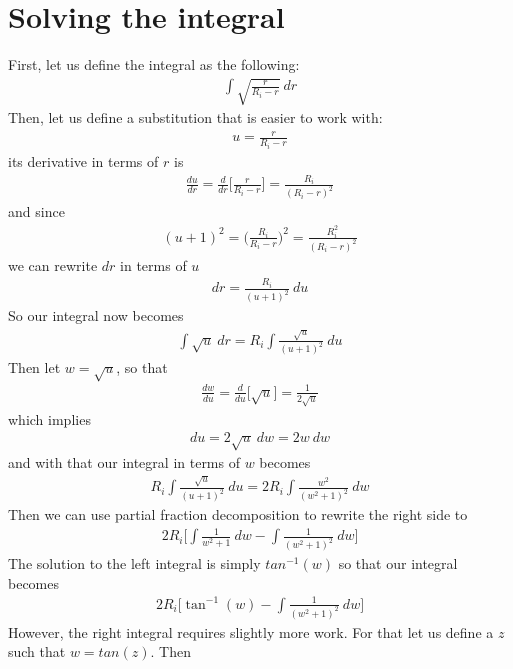 \documentclass{article}
\begin{document}
\section{Solving the integral}
First, let us define the integral as the following:
\begin{align}
    \int \sqrt{\frac{r}{R_i - r}} ~ dr
\end{align}
Then, let us define a substitution that is easier to work with:
\begin{align}
    u = \frac{r}{R_i - r}
\end{align}
its derivative in terms of $r$ is
\begin{align}
    \frac{du}{dr} = \frac{d}{dr}\Bigg[ \frac{r}{R_i - r} \Bigg] = \frac{R_i}{(R_i - r)^2}
\end{align}
and since
\begin{align}
    (u + 1)^2 = \biggr(\frac{R_i}{R_i - r}\biggl)^2 = \frac{R_i^2}{(R_i - r)^2}
\end{align}
we can rewrite $dr$ in terms of $u$
\begin{align}
    dr = \frac{R_i}{(u+1)^2} ~du
\end{align}
So our integral now becomes
\begin{align}
    \int \sqrt{u} ~ dr = R_i \int \frac{\sqrt{u}}{(u + 1)^2} ~ du
\end{align}
Then let $w = \sqrt{u}$, so that
\begin{align}
    \frac{dw}{du} = \frac{d}{du} \biggl[ \sqrt{u} \biggr] = \frac{1}{2\sqrt{u}}
\end{align}
which implies
\begin{align}
    du = 2\sqrt{u}~dw = 2w~ dw
\end{align}
and with that our integral in terms of $w$ becomes
\begin{align}
    R_i \int \frac{\sqrt{u}}{(u + 1)^2} ~ du = 2R_i \int \frac{w^2}{(w^2 + 1)^2}~ dw
\end{align}
Then we can use partial fraction decomposition to rewrite the right side to
\begin{align}
    2R_i \Biggl[ \int \frac{1}{w^2 + 1} ~dw - \int \frac{1}{(w^2 + 1)^2} ~dw \Biggr]
\end{align}
The solution to the left integral is simply $tan^{-1}(w)$ so that our integral becomes
\begin{align}
    2R_i \Biggl[ \tan^{-1}(w) - \int \frac{1}{(w^2 + 1)^2} ~dw \Biggr]
\end{align}
However, the right integral requires slightly more work. For that let us define a $z$ such that $w = tan(z)$. Then
\end{document}

